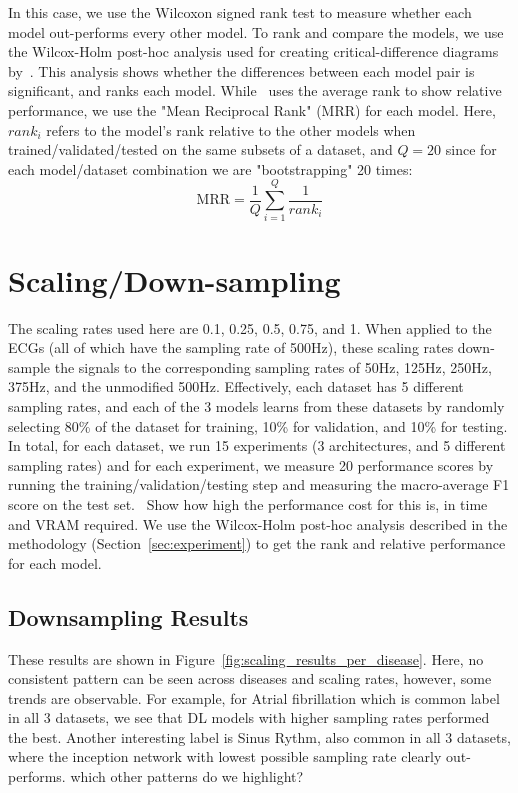\documentclass[pmlr,twocolumn]{jmlr}%
\begin{document}
In this case, we use the Wilcoxon signed rank test to measure whether each model out-performs every other model. To rank and compare the models, we use the Wilcox-Holm post-hoc analysis used for creating critical-difference diagrams by~\cite{IsmailFawaz2018deep}. This analysis shows whether the differences between each model pair is significant, and ranks each model. While~\cite{IsmailFawaz2018deep} uses the average rank to show relative performance, we use the "Mean Reciprocal Rank" (MRR) for each model. Here, $rank_i$ refers to the model's rank relative to the other models when trained/validated/tested on the same subsets of a dataset, and $Q=20$ since for each model/dataset combination we are "bootstrapping" 20 times:
\[ \text{MRR} = \frac{1}{Q}\sum_{i=1}^{Q}\frac{1}{rank_i} \]


\section{Scaling/Down-sampling}
\label{sec:scaling}
The scaling rates used here are 0.1, 0.25, 0.5, 0.75, and 1. When applied to the ECGs (all of which have the sampling rate of 500Hz), these scaling rates down-sample the signals to the corresponding sampling rates of 50Hz, 125Hz, 250Hz, 375Hz, and the unmodified 500Hz. Effectively, each dataset has 5 different sampling rates, and each of the 3 models learns from these datasets by randomly selecting 80\% of the dataset for training, 10\% for validation, and 10\% for testing. In total, for each dataset, we run 15 experiments (3 architectures, and 5 different sampling rates) and for each experiment, we measure 20 performance scores by running the training/validation/testing step and measuring the macro-average F1 score on the test set.~{\color{red} Show how high the performance cost for this is, in time and VRAM required}. We use the Wilcox-Holm post-hoc analysis described in the methodology (Section~\ref{sec:experiment}) to get the rank and relative performance for each model. 
\subsection{Downsampling Results}
These results are shown in Figure~\ref{fig:scaling_results_per_disease}. Here, no consistent pattern can be seen across diseases and scaling rates, however, some trends are observable. For example, for Atrial fibrillation which is common label in all 3 datasets, we see that DL models with higher sampling rates performed the best. Another interesting label is Sinus Rythm, also common in all 3 datasets,  where the inception network with lowest possible sampling rate clearly out-performs. {\color{red} which other patterns do we highlight?}\\
\end{document}
